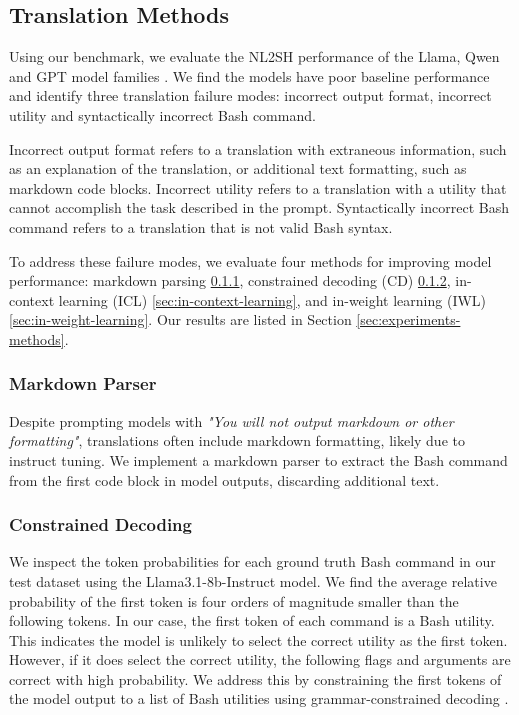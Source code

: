 \documentclass[11pt]{article}
\begin{document}
\subsection{Translation Methods}
Using our benchmark, we evaluate the NL2SH performance of the Llama, Qwen and GPT model families \cite{llama3, qwen, gpt4}. We find the models have poor baseline performance and identify three translation failure modes: incorrect output format, incorrect utility and syntactically incorrect Bash command.

Incorrect output format refers to a translation with extraneous information, such as an explanation of the translation, or additional text formatting, such as markdown code blocks. Incorrect utility refers to a translation with a utility that cannot accomplish the task described in the prompt. Syntactically incorrect Bash command refers to a translation that is not valid Bash syntax.

To address these failure modes, we evaluate four methods for improving model performance: markdown parsing \ref{sec:markdown-parser}, constrained decoding (CD) \ref{sec:constrained-decoding}, in-context learning (ICL) \ref{sec:in-context-learning}, and in-weight learning (IWL) \ref{sec:in-weight-learning}. Our results are listed in Section \ref{sec:experiments-methods}.

\subsubsection{Markdown Parser}
\label{sec:markdown-parser}
Despite prompting models with \textit{"You will not output markdown or other formatting"}, translations often include markdown formatting, likely due to instruct tuning. We implement a markdown parser to extract the Bash command from the first code block in model outputs, discarding additional text.

\subsubsection{Constrained Decoding}
\label{sec:constrained-decoding}
We inspect the token probabilities for each ground truth Bash command in our test dataset using the Llama3.1-8b-Instruct model. We find the average relative probability of the first token is four orders of magnitude smaller than the following tokens. In our case, the first token of each command is a Bash utility. This indicates the model is unlikely to select the correct utility as the first token. However, if it does select the correct utility, the following flags and arguments are correct with high probability. We address this by constraining the first tokens of the model output to a list of Bash utilities using grammar-constrained decoding \citet{constrained}.
\end{document}
